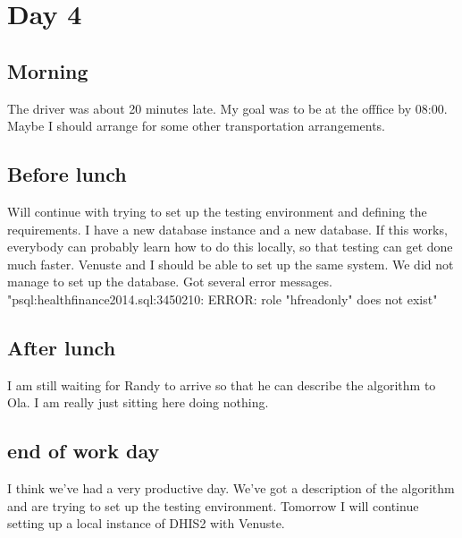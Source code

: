 \section{Day 4}
\subsection{Morning}
The driver was about 20 minutes late. My goal was to be at the offfice by 08:00.
Maybe I should arrange for some other transportation arrangements.

\subsection{Before lunch}
Will continue with trying to set up the testing environment and defining the requirements.
I have a new database instance and a new database.
If this works, everybody can probably learn how to do this locally, so that testing can get done much faster.
Venuste and I should be able to set up the same system.
We did not manage to set up the database. Got several error messages.
"psql:healthfinance2014.sql:3450210: ERROR:  role "hfreadonly" does not exist"
\subsection{After lunch}
I am still waiting for Randy to arrive so that he can describe the algorithm to Ola.
I am really just sitting here doing nothing. 

\subsection{end of work day}
I think we've had a very productive day.
We've got a description of the algorithm and are trying to set up the testing environment.
Tomorrow I will continue setting up a local instance of DHIS2 with Venuste.

